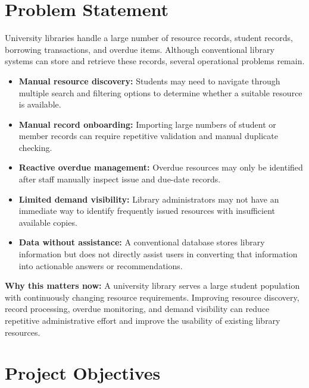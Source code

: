 \documentclass{tietreport}
\begin{document}
\section{Problem Statement}

University libraries handle a large number of resource records, student
records, borrowing transactions, and overdue items. Although conventional
library systems can store and retrieve these records, several operational
problems remain.

\begin{itemize}

    \item \textbf{Manual resource discovery:}
    Students may need to navigate through multiple search and filtering
    options to determine whether a suitable resource is available.

    \item \textbf{Manual record onboarding:}
    Importing large numbers of student or member records can require
    repetitive validation and manual duplicate checking.

    \item \textbf{Reactive overdue management:}
    Overdue resources may only be identified after staff manually inspect
    issue and due-date records.

    \item \textbf{Limited demand visibility:}
    Library administrators may not have an immediate way to identify
    frequently issued resources with insufficient available copies.

    \item \textbf{Data without assistance:}
    A conventional database stores library information but does not
    directly assist users in converting that information into actionable
    answers or recommendations.

\end{itemize}

\textbf{Why this matters now:}
A university library serves a large student population with continuously
changing resource requirements. Improving resource discovery, record
processing, overdue monitoring, and demand visibility can reduce repetitive
administrative effort and improve the usability of existing library
resources.

\section{Project Objectives}
\end{document}
